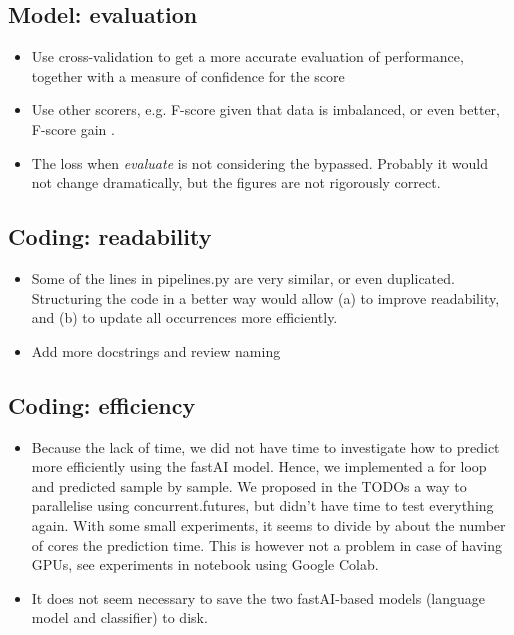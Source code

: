 \documentclass[11pt, oneside]{article}   	%
\begin{document}
\subsection{Model: evaluation}

\begin{itemize}
\item Use cross-validation to get a more accurate evaluation of performance, together with a measure of confidence for the score
\item Use other scorers, e.g. F-score given that data is imbalanced, or even better, F-score gain \cite{PRG}.
\item The loss when \textit{evaluate} is not considering the bypassed. Probably it would not change dramatically, but the figures are not rigorously correct.
\end{itemize}

\subsection{Coding: readability}

\begin{itemize}
\item Some of the lines in \textsf{pipelines.py} are very similar, or even duplicated. Structuring the code in a better way would allow (a) to improve readability, and (b) to update all occurrences more efficiently.
\item Add more docstrings and review naming
\end{itemize}

\subsection{Coding: efficiency}

\begin{itemize}
\item Because the lack of time, we did not have time to investigate how to predict more efficiently using the fastAI model. Hence, we implemented a for loop and predicted sample by sample. We proposed in the TODOs a way to parallelise using \textsf{concurrent.futures}, but didn't have time to test everything again. With some small experiments, it seems to divide by about the number of cores the prediction time. This is however not a problem in case of having GPUs, see experiments in notebook using Google Colab.
\item It does not seem necessary to save the two fastAI-based models (language model and classifier) to disk.
\end{itemize}
\end{document}
